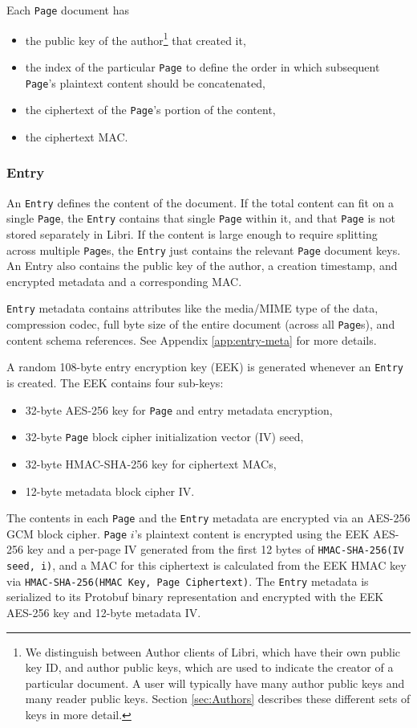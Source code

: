 \documentclass[10pt]{article}
\newcommand{\ttt}[1]{\texttt{#1}}
\def\Entry{\ttt{Entry}}
\def\Page{\ttt{Page}}
\begin{document}
Each \Page{} document has 
\begin{itemize}
	\item the public key of the author\footnote{We distinguish between Author clients of Libri, which have their own public key ID, and author public keys, which are used to indicate the creator of a particular document. A user will typically have many author public keys and many reader public keys. Section \ref{sec:Authors} describes these different sets of keys in more detail.} that created it,
	\item the index of the particular \Page{} to define the order in which subsequent \Page{}'s plaintext content should be concatenated,
	\item the ciphertext of the \Page{}'s portion of the content,
	\item the ciphertext MAC.
\end{itemize}

\subsubsection{Entry}
An \Entry{} defines the content of the document. If the total content can fit on a single \Page{}, the \Entry{} contains that single \Page{} within it, and that \Page{} is not stored separately in Libri. If the content is large enough to require splitting across multiple \Page{}s, the \Entry{} just contains the relevant \Page{} document keys. An Entry also contains the public key of the author, a creation timestamp, and encrypted metadata and a corresponding MAC. 

\Entry{} metadata contains attributes like the media/MIME type of the data, compression codec, full byte size of the entire document (across all \Page{}s), and content schema references. See Appendix \ref{app:entry-meta} for more details. 

A random 108-byte entry encryption key (EEK) is generated whenever an \Entry{} is created. The EEK contains four sub-keys:
\begin{itemize}
	\item 32-byte AES-256 key for \Page{} and entry metadata encryption,
	\item 32-byte \Page{} block cipher initialization vector (IV) seed,
	\item 32-byte HMAC-SHA-256 key for ciphertext MACs,
	\item 12-byte metadata block cipher IV.
\end{itemize}
The contents in each \Page{} and the \Entry{} metadata are encrypted via an AES-256 GCM block cipher. \Page{} $i$'s plaintext content is encrypted using the EEK AES-256 key and a per-page IV generated from the first 12 bytes of \ttt{HMAC-SHA-256(IV seed, i)}, and a MAC for this ciphertext is calculated from the EEK HMAC key via \ttt{HMAC-SHA-256(HMAC Key, Page Ciphertext)}. The \Entry{} metadata is serialized to its Protobuf binary representation and encrypted with the EEK AES-256 key and 12-byte metadata IV. 
\end{document}
